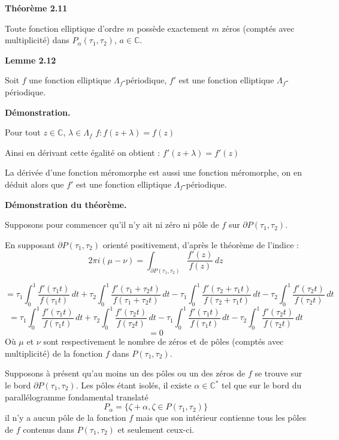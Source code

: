 \documentclass{article}
\begin{document}
\textbf{Théorème 2.11}

Toute fonction elliptique d'ordre \( m \) possède exactement \( m \) zéros (comptés avec multiplicité) dans \( P_{\alpha}(\tau_1, \tau_2) \), \( a \in \mathbb{C} \).

\textbf{Lemme 2.12}

Soit \( f \) une fonction elliptique \( \Lambda_f \)-périodique, \( f' \) est une fonction elliptique \( \Lambda_f\)-périodique.

\textbf{Démonstration.}

Pour tout \( z \in \mathbb{C} \), \( \lambda \in \Lambda_f \) \( f: f(z + \lambda) = f(z) \)

Ainsi en dérivant cette égalité on obtient : \( f'(z + \lambda) = f'(z) \)

La dérivée d'une fonction méromorphe est aussi une fonction méromorphe, on en déduit alors que \( f' \) est une fonction
elliptique \( \Lambda_f \)-périodique.

\textbf{Démonstration du théorème.}

Supposons pour commencer qu'il n'y ait ni zéro ni pôle de \( f \) sur \( \partial P(\tau_1, \tau_2) \).

En supposant \( \partial P(\tau_1, \tau_2) \) orienté positivement, d'après le théorème de l'indice :
\[
2\pi i(\mu - \nu) = \int_{\partial P(\tau_1, \tau_2)} \frac{f'(z)}{f(z)} \, dz
\]

\[
= \tau_1  \int_0^1 \frac{f'(\tau_1 t)}{f(\tau_1 t)} \, dt + \tau_2 \int_0^1 \frac{f'(\tau_1 + \tau_2 t)}{f(\tau_1 + \tau_2 t)} \, dt - \tau_1 \int_0^1 \frac{f'(\tau_2 + \tau_1 t)}{f(\tau_2 + \tau_1 t)} \, dt - \tau_2 \int_0^1 \frac{f'(\tau_2 t)}{f(\tau_2 t)} \, dt
\]
\[
= \tau_1  \int_0^1 \frac{f'(\tau_1 t)}{f(\tau_1 t)} \, dt + \tau_2\int_0^1 \frac{f'( \tau_2 t)}{f( \tau_2 t)} \, dt - \tau_1\int_0^1 \frac{f'( \tau_1 t)}{f( \tau_1 t)} \, dt - \tau_2\int_0^1 \frac{f'(\tau_2 t)}{f(\tau_2 t)} \, dt
\]
\[
= 0
\]
Où \( \mu \) et \( \nu \) sont respectivement le nombre de zéros et de pôles (comptés avec multiplicité) de la fonction \( f \) dans \( P(\tau_1, \tau_2) \).

Supposons à présent qu'au moins un des pôles ou un des zéros de \( f \) se trouve sur le bord \( \partial P(\tau_1, \tau_2) \). Les pôles étant isolés, il existe \( \alpha \in \mathbb{C}^* \) tel que sur le bord du parallélogramme fondamental translaté
\[
P_\alpha = \{\zeta + \alpha, \zeta \in P(\tau_1, \tau_2)\}
\]
il n'y a aucun pôle de la fonction \( f \) mais que son intérieur contienne tous les pôles de \( f \) contenus dans \( P(\tau_1, \tau_2) \) et seulement ceux-ci.
\end{document}
